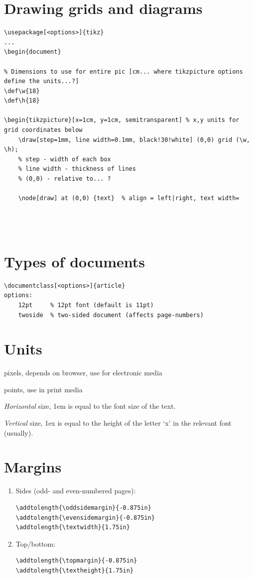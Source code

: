 \documentclass{article}
\begin{document}
\section{Drawing grids and diagrams}
\begin{lstlisting}
\usepackage[<options>]{tikz}
...
\begin{document}

% Dimensions to use for entire pic [cm... where tikzpicture options define the units...?]
\def\w{18}
\def\h{18}

\begin{tikzpicture}[x=1cm, y=1cm, semitransparent] % x,y units for grid coordinates below
    \draw[step=1mm, line width=0.1mm, black!30!white] (0,0) grid (\w, \h);
    % step - width of each box
    % line width - thickness of lines
    % (0,0) - relative to... ?

    \node[draw] at (0,0) {text}  % align = left|right, text width=




\end{lstlisting}

\section{Types of documents}
\begin{lstlisting}
\documentclass[<options>]{article}
options:
    12pt     % 12pt font (default is 11pt)
    twoside  % two-sided document (affects page-numbers)
\end{lstlisting}

\section{Units}
\begin{description}[itemsep=-1ex]
    \item [px] pixels, depends on browser, use for electronic media
    \item [pt] points, use in print media
    \item [em] \emph{Horizontal} size, 1em is equal to the font size of
        the text.
    \item [ex] \emph{Vertical} size, 1ex is equal to the height of the
        letter `x' in the relevant font (usually).
\end{description}

\section{Margins}
\begin{enumerate}
    \item Sides (odd- and even-numbered pages):
\begin{lstlisting}
\addtolength{\oddsidemargin}{-0.875in}
\addtolength{\evensidemargin}{-0.875in}
\addtolength{\textwidth}{1.75in}
\end{lstlisting}
    \item Top/bottom:
\begin{lstlisting}
\addtolength{\topmargin}{-0.875in}
\addtolength{\textheight}{1.75in}
\end{lstlisting}
\end{enumerate}
\end{document}
